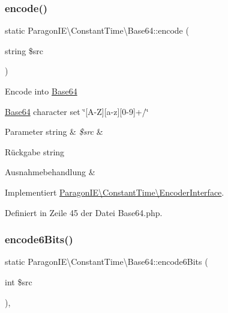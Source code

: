 \subsubsection{\texorpdfstring{encode()}{encode()}}
{\footnotesize\ttfamily static Paragon\+I\+E\textbackslash{}\+Constant\+Time\textbackslash{}\+Base64\+::encode (\begin{DoxyParamCaption}\item[{string}]{\$src }\end{DoxyParamCaption})\hspace{0.3cm}{\ttfamily [static]}}

Encode into \mbox{\hyperlink{class_paragon_i_e_1_1_constant_time_1_1_base64}{Base64}}

\mbox{\hyperlink{class_paragon_i_e_1_1_constant_time_1_1_base64}{Base64}} character set \char`\"{}\mbox{[}\+A-\/\+Z\mbox{]}\mbox{[}a-\/z\mbox{]}\mbox{[}0-\/9\mbox{]}+/\char`\"{}


\begin{DoxyParams}[1]{Parameter}
string & {\em \$src} & \\
\hline
\end{DoxyParams}
\begin{DoxyReturn}{Rückgabe}
string 
\end{DoxyReturn}

\begin{DoxyExceptions}{Ausnahmebehandlung}
{\em } & \\
\hline
\end{DoxyExceptions}


Implementiert \mbox{\hyperlink{interface_paragon_i_e_1_1_constant_time_1_1_encoder_interface_a6b9b7e0f5446b6b08b074a9fc7ae3c61}{Paragon\+I\+E\textbackslash{}\+Constant\+Time\textbackslash{}\+Encoder\+Interface}}.



Definiert in Zeile 45 der Datei Base64.\+php.

\mbox{\label{class_paragon_i_e_1_1_constant_time_1_1_base64_ae249195486f9ab9805bd56209bddb261}} 
\subsubsection{\texorpdfstring{encode6\+Bits()}{encode6Bits()}}
{\footnotesize\ttfamily static Paragon\+I\+E\textbackslash{}\+Constant\+Time\textbackslash{}\+Base64\+::encode6\+Bits (\begin{DoxyParamCaption}\item[{int}]{\$src }\end{DoxyParamCaption})\hspace{0.3cm}{\ttfamily [static]}, {\ttfamily [protected]}}

